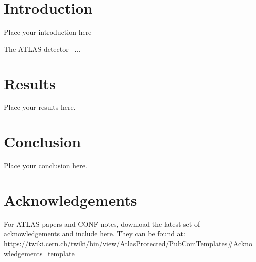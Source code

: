 \documentclass[txfonts,UKenglish]{latex/atlasdoc}
\begin{document}
\tableofcontents


\section{Introduction}
\label{sec:intro}

Place your introduction here



The ATLAS detector~\cite{atlas-detector} ...
% 


\section{Results}
\label{sec:result}

Place your results here.


\section{Conclusion}
\label{sec:conclusion}

Place your conclusion here.


\section*{Acknowledgements}

For ATLAS papers and CONF notes, download the latest set of acknowledgements and include here.
They can be found at:\\
\url{https://twiki.cern.ch/twiki/bin/view/AtlasProtected/PubComTemplates#Acknowledgements_template}
\end{document}
